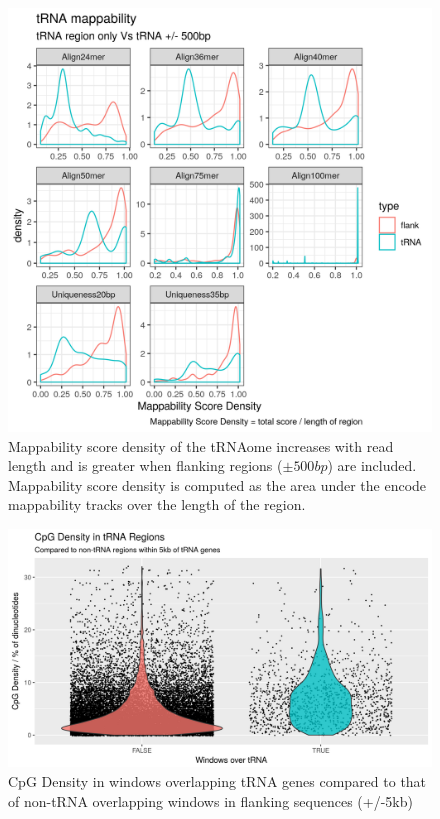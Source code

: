 \documentclass[
]{book}
\begin{document}
\begin{figure}

{\centering \includegraphics[width=1\linewidth]{./figs/mappabilityScoreDensity_tRNAVsFlank500} 

}

\caption{Mappability score density of the tRNAome increases with read length and is greater when flanking regions (\(\pm500bp\)) are included. Mappability score density is computed as the area under the encode mappability tracks \citep{Derrien2012} over the length of the region.}\label{fig:mappabilityScoreDensity}
\end{figure}



\begin{figure}

{\centering \includegraphics[width=1\linewidth]{figs/CpGcountBGvstRNAPlot} 

}

\caption{CpG Density in windows overlapping tRNA genes compared to that of non-tRNA overlapping windows in flanking sequences (+/-5kb)}\label{fig:CpGcountBGvstRNAPlot}
\end{figure}
\end{document}
